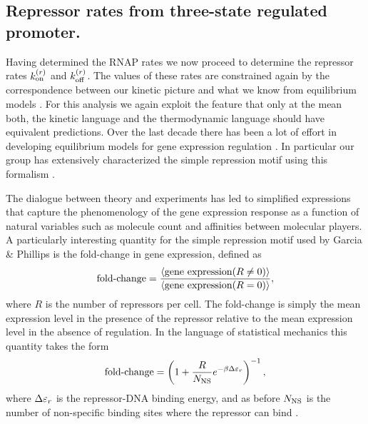 \subsection{Repressor rates from three-state regulated promoter.}

Having determined the RNAP rates we now proceed to determine the repressor rates
$k^{(r)}_{\text{on}}$ and $k^{(r)}_{\text{off}}$. The values of these rates are constrained again by the
correspondence between our kinetic picture and what we know from equilibrium
models \cite{Phillips2015}. For this analysis we again exploit the feature that
only at the mean both, the kinetic language and the thermodynamic language
should have equivalent predictions. Over the last decade there has been a lot of
effort in developing equilibrium models for gene expression regulation
\cite{Buchler2003, Vilar2011, Bintu2005a}. In particular our group has
extensively characterized the simple repression motif using this formalism
\cite{Garcia2011c, Brewster2014, Razo-Mejia2018}.

The dialogue between theory and experiments has led to simplified expressions
that capture the phenomenology of the gene expression response as a function of
natural variables such as molecule count and affinities between molecular
players. A particularly interesting quantity for the simple repression motif
used by Garcia \& Phillips \cite{Garcia2011c} is the fold-change in gene
expression, defined as
\begin{equation}
  \text{fold-change} = {\left\langle \text{gene expression}(R \neq 0) \right\rangle \over
                 \left\langle \text{gene expression}(R = 0) \right\rangle},
\end{equation}
where $R$ is the number of repressors per cell. The fold-change is simply the
mean expression level in the presence of the repressor relative to the mean
expression level in the absence of regulation. In the language of statistical
mechanics this quantity takes the form
\begin{equation}
  \text{fold-change} = \left( 1 + {R \over N_\text{NS}} e^{-\beta\Delta\varepsilon_r} \right)^{-1},
  \label{seq_fc_thermo}
\end{equation}
where $\Delta\varepsilon_r$ is the repressor-DNA binding energy, and as before $N_\text{NS}$ is the
number of non-specific binding sites where the repressor can bind
\cite{Garcia2011c}.

